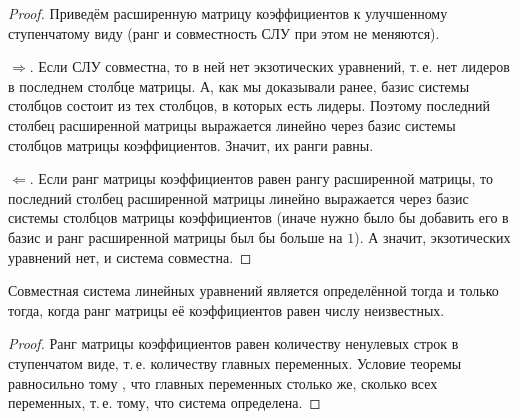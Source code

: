 \begin{proof}
    Приведём расширенную матрицу коэффициентов к улучшенному ступенчатому виду (ранг и совместность СЛУ при этом не меняются).

    $\Rightarrow$. Если СЛУ совместна, то в ней нет экзотических уравнений, т.\,е. нет лидеров в последнем столбце матрицы. А, как мы доказывали ранее, базис системы столбцов состоит из тех столбцов, в которых есть лидеры. Поэтому последний столбец расширенной матрицы выражается линейно через базис системы столбцов матрицы коэффициентов. Значит, их ранги равны.

    $\Leftarrow$. Если ранг матрицы коэффициентов равен рангу расширенной матрицы, то последний столбец расширенной матрицы линейно выражается через базис системы столбцов матрицы коэффициентов (иначе нужно было бы добавить его в базис и ранг расширенной матрицы был бы больше на $1$). А значит, экзотических уравнений нет, и система совместна.
\end{proof}

\begin{theorem}
    Совместная система линейных уравнений является определённой тогда и только тогда, когда ранг матрицы её коэффициентов равен числу неизвестных.
\end{theorem}

\begin{proof}
    Ранг матрицы коэффициентов равен количеству ненулевых строк в ступенчатом виде, т.\,е. количеству главных переменных. Условие теоремы равносильно тому , что главных переменных столько же, сколько всех переменных, т.\,е. тому, что система определена.
\end{proof}

